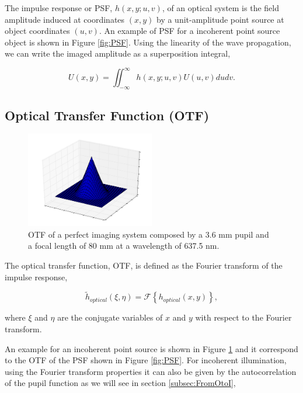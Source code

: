 The impulse response or PSF, $h(x,y;u,v)$, of an optical system is  the field amplitude induced at coordinates $(x,y)$ by a unit-amplitude point source at object coordinates $(u,v)$. An example of PSF for a incoherent point source object is shown in Figure \ref{fig:PSF}. Using the linearity of the wave propagation, we can write the imaged amplitude as a superposition integral,

\begin{equation}
U(x,y) = \iint_{-\infty}^{\infty} h(x,y;u,v)U(u,v)dudv.
\label{eqt:superpositionIntegral}
\end{equation}

\subsection{Optical Transfer Function (OTF)}
\label{subsec:OTF}

\begin{figure}
\begin{center}
\includegraphics[width=0.5\textwidth,angle=0]{Figures/OTF}
\decoRule
\caption{OTF of a perfect imaging system composed by a 3.6 mm pupil and a focal length of 80 mm at a wavelength of 637.5 nm.}
\label{fig:OTF}
\end{center}
\end{figure}

The optical transfer function, OTF, is defined as the Fourier transform of the impulse response,

\begin{equation}
\widetilde{h}_{optical}(\xi,\eta) = \mathcal{F}\left\lbrace h_{optical}(x,y)\right\rbrace ,
\label{eqt:OTF}
\end{equation}

where $\xi$ and $\eta$ are the conjugate variables of $x$ and $y$ with respect to the Fourier transform.

An example for an incoherent point source is shown in Figure \ref{fig:OTF} and it correspond to the OTF of the PSF shown in Figure \ref{fig:PSF}. For incoherent illumination, using the Fourier transform properties it can also be given by the autocorrelation of the pupil function as we will see in section \ref{subsec:FromOtoI},

